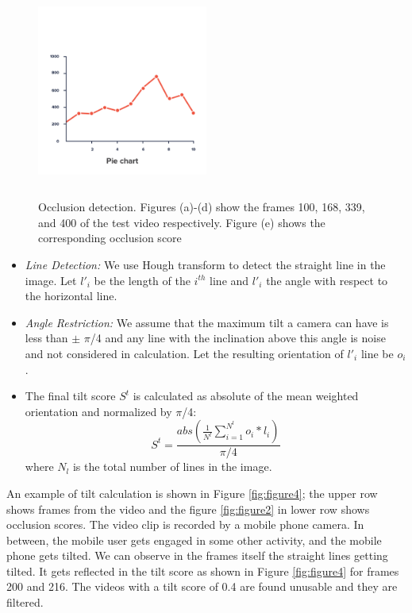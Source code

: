 \documentclass{sig-alternate}
\begin{document}
 \begin{figure}[h]
\includegraphics[width=0.5\textwidth ,height = 7cm]{2}
\caption{ Occlusion detection. Figures (a)-(d) show the frames 100, 168, 339, and 400 of the test video respectively. Figure (e) shows the corresponding occlusion score
}
\label{fig:figure3}
\end{figure}
\begin{itemize}
\item  \textit{Line Detection:} We use Hough transform to detect the straight line in the image. Let \(l'_i\) be the length of the \(i^{th}\) line and \(l'_i\) the angle with respect to the horizontal line.
\item \textit{Angle Restriction:} We assume that the maximum tilt a camera can have is less than $\pm$ $\pi$/4 and any line with the inclination above this angle is noise and not considered in calculation. Let the resulting orientation of \(l'_i\) line be \(o_i\). 
\item The final tilt score \(S^t\) is calculated as absolute of the mean weighted orientation and normalized by $\pi$/4:
\begin{equation}
S^t = \frac{abs( \frac{1}{N^l}\sum_{i=1}^{N^l}o_i*l_i )}{\pi/4} 
\end{equation}
where \(N_l\) is the total number of lines in the image.
\end{itemize}

An example of tilt calculation is shown in Figure \ref{fig:figure4}; the upper row shows frames from the video and the figure \ref{fig:figure2} in lower row shows occlusion scores. The video clip is recorded by a mobile phone camera. In between, the mobile user gets engaged in some other activity, and the mobile phone gets tilted. We can observe in the frames itself the straight lines getting tilted. It gets reflected in the tilt score as shown in Figure \ref{fig:figure4} for frames 200 and 216. The videos with a tilt score of 0.4 are found unusable and they are filtered. 
\end{document}
